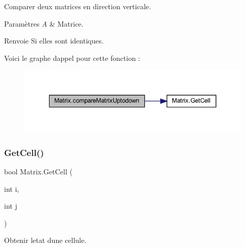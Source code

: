Comparer deux matrices en direction verticale. 


\begin{DoxyParams}{Paramètres}
{\em A} & Matrice.\\
\hline
\end{DoxyParams}
\begin{DoxyReturn}{Renvoie}
Si elles sont identiques.
\end{DoxyReturn}
Voici le graphe d\textquotesingle{}appel pour cette fonction \+:\nopagebreak
\begin{figure}[H]
\begin{center}
\leavevmode
\includegraphics[width=349pt]{class_matrix_af7b27f62f9cc10b69fd583dea958573f_cgraph}
\end{center}
\end{figure}
\mbox{\label{class_matrix_aeb46ec5d650af142b30d0fd11f6895c3}} 
\subsubsection{\texorpdfstring{Get\+Cell()}{GetCell()}}
{\footnotesize\ttfamily bool Matrix.\+Get\+Cell (\begin{DoxyParamCaption}\item[{int}]{i,  }\item[{int}]{j }\end{DoxyParamCaption})\hspace{0.3cm}{\ttfamily [inline]}}



Obtenir l\textquotesingle{}etat d\textquotesingle{}une cellule. 


